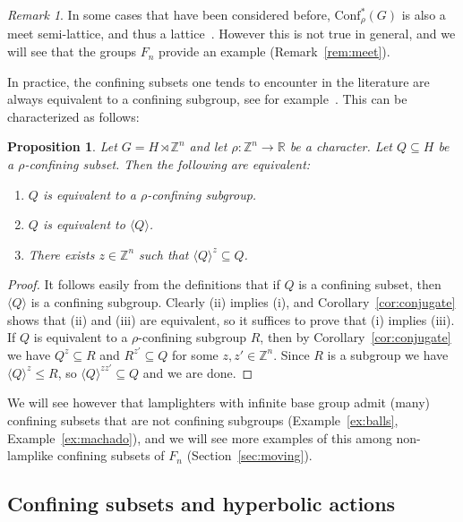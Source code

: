 \documentclass[10pt,a4paper]{article}
\newtheorem{prop}[cdrthm]{Proposition}
\theoremstyle{definition}
\theoremstyle{remark}
\newtheorem{rema}[cdrthm]{Remark}
\newcommand{\Z}{\mathbb{Z}}
\newcommand{\R}{\mathbb{R}}
\newcommand{\Conf}{\mathrm{Conf}}
\theoremstyle{plain}
\begin{document}
\begin{rema}
In some cases that have been considered before, $\Conf^\ast_\rho(G)$ is also a meet semi-lattice, and thus a lattice~\cite{sahana:wreath, AR:BS, ABR2}. However this is not true in general, and we will see that the groups $F_n$ provide an example (Remark~\ref{rem:meet}).
\end{rema}

In practice, the confining subsets one tends to encounter in the literature are always equivalent to a confining subgroup, see for example~\cite{caprace15, sahana:wreath, AR:BS, ABR2}. This can be characterized as follows:

\begin{prop}\label{prop:equiv_to_subgroup}
Let $G=H\rtimes \Z^n$ and let $\rho\colon \Z^n \to\R$ be a character. Let $Q\subseteq H$ be a $\rho$-confining subset. Then the following are equivalent:
\begin{enumerate}
    \item $Q$ is equivalent to a $\rho$-confining subgroup.
    \item $Q$ is equivalent to $\langle Q\rangle$.
    \item There exists $z\in \Z^n$ such that $\langle Q\rangle^z\subseteq Q$.
\end{enumerate}
\end{prop}

\begin{proof}
It follows easily from the definitions that if $Q$ is a confining subset, then $\langle Q \rangle$ is a confining subgroup. Clearly (ii) implies (i), and Corollary~\ref{cor:conjugate} shows that (ii) and (iii) are equivalent, so it suffices to prove that (i) implies (iii). If $Q$ is equivalent to a $\rho$-confining subgroup $R$, then by Corollary~\ref{cor:conjugate} we have $Q^z\subseteq R$ and $R^{z'}\subseteq Q$ for some $z,z'\in\Z^n$. Since $R$ is a subgroup we have $\langle Q\rangle^z\le R$, so $\langle Q\rangle^{zz'}\subseteq Q$ and we are done.
\end{proof}

We will see however that lamplighters with infinite base group admit (many) confining subsets that are not confining subgroups (Example~\ref{ex:balls}, Example~\ref{ex:machado}), and we will see more examples of this among non-lamplike confining subsets of $F_n$ (Section~\ref{sec:moving}).


\subsection{Confining subsets and hyperbolic actions}\label{ssec:conf_hyp}
\end{document}
